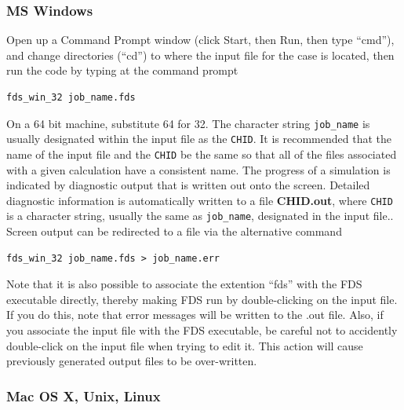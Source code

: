 \documentclass[11pt]{book}
\newcommand{\ct}{\tt\small}
\begin{document}
\subsubsection{MS Windows}

Open up a Command Prompt window (click Start, then Run, then type ``cmd''), and change directories (``cd'') to where the
input file for the case is located, then run the code by typing at the command prompt
\begin{verbatim}
fds_win_32 job_name.fds
\end{verbatim}
On a 64 bit machine, substitute 64 for 32.
The character string {\ct job\_name} is usually
designated within the input file as the {\ct CHID}. It is recommended that the
name of the input file and the {\ct CHID} be the same so that all of the
files associated with a given calculation have a consistent name.  The progress of a simulation is indicated by diagnostic output that is written
out onto the screen. Detailed diagnostic information is automatically
written to a file {\bf CHID.out}, where {\ct CHID} is a character
string, usually the same as {\ct job\_name}, designated in the input file..
Screen output can be redirected to a file via the alternative command
\begin{verbatim}
fds_win_32 job_name.fds > job_name.err
\end{verbatim}
Note that it is also possible to associate the extention ``fds'' with the FDS executable directly, thereby making FDS run by
double-clicking on the input file. If you do this, note that error messages will be written to the .out file. Also, if you
associate the input file with the FDS executable, be careful not to accidently double-click on the input file when trying to edit it.
This action will cause previously generated output files to be over-written.



\subsubsection{Mac OS X, Unix, Linux}
\end{document}
